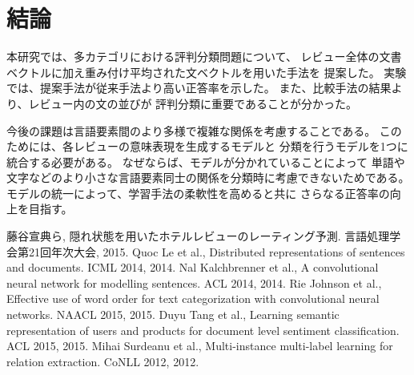 \documentclass{ttisummary}
\begin{document}
\section{結論}

本研究では、多カテゴリにおける評判分類問題について、
レビュー全体の文書ベクトルに加え重み付け平均された文ベクトルを用いた手法を
提案した。
実験では、提案手法が従来手法\cite{fujitani15}より高い正答率を示した。
また、比較手法の結果より、レビュー内の文の並びが
評判分類に重要であることが分かった。

今後の課題は言語要素間のより多様で複雑な関係を考慮することである。
このためには、各レビューの意味表現を生成するモデルと
分類を行うモデルを1つに統合する必要がある。
なぜならば、モデルが分かれていることによって
単語や文字などのより小さな言語要素同士の関係を分類時に考慮できないためである。
モデルの統一によって、学習手法の柔軟性を高めると共に
さらなる正答率の向上を目指す。




\begin{thebibliography}{9}
  藤谷宣典ら,
  隠れ状態を用いたホテルレビューのレーティング予測.
  言語処理学会第21回年次大会, 2015.
  Quoc Le et al.,
  Distributed representations of sentences and documents.
  ICML 2014, 2014.
  Nal Kalchbrenner et al.,
  A convolutional neural network for modelling sentences.
  ACL 2014, 2014.
  Rie Johnson et al.,
  Effective use of word order for text categorization
  with convolutional neural networks.
  NAACL 2015, 2015.
  Duyu Tang et al.,
  Learning semantic representation of users and products
  for document level sentiment classification.
  ACL 2015, 2015.
  Mihai Surdeanu et al.,
  Multi-instance multi-label learning for relation extraction.
  CoNLL 2012, 2012.
\end{thebibliography}
\end{document}
